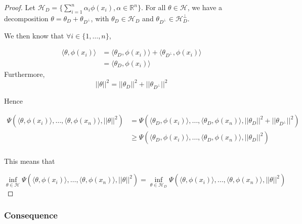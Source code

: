 \documentclass[
10pt, %
a4paper, %
oneside, %
headinclude,footinclude, %
BCOR5mm, %
]{scrartcl}
\begin{document}
\begin{proof}
    Let $ \mathcal{H}_D = \{  \sum^{n}_{i=1} \alpha_i\phi(x_i), \alpha\in \mathbb{R}^n\}$. For all $ \theta\in \mathcal{H} $, we have a decomposition $ \theta = \theta_D+ \theta_{D^{\perp}}$, with $ \theta_D \in \mathcal{H}_D $ and $ \theta_{D^{\perp}} \in \mathcal{H}_D^{\perp} $.

    We then know that $\forall i\in \{1, \dots, n\}$,
    
    \begin{equation*}
	\begin{aligned}
	    \langle \theta, \phi(x_i) \rangle &= \langle \theta_D, \phi(x_i) \rangle+ \langle \theta_{D^{\perp}}, \phi(x_i) \rangle\\
	    &= \langle \theta_D, \phi(x_i) \rangle
	\end{aligned}
    \end{equation*}
    Furthermore,
    \begin{equation*}
	|| \theta||^2 = || \theta_D||^2+ || \theta_{D^{\perp}}||^2
    \end{equation*}

    Hence

    \begin{equation*}
        \begin{aligned}
            \label{eq:}
	    \Psi(\langle\theta,\phi(x_i) \rangle, \dots, \langle\theta, \phi(x_n) \rangle, ||\theta||^2)&=\Psi(\langle\theta_D,\phi(x_i) \rangle, \dots, \langle\theta_D, \phi(x_n) \rangle, || \theta_D||^2+ || \theta_{D^{\perp}}||^2)\\
	    &\geq \Psi(\langle\theta_D,\phi(x_i) \rangle, \dots, \langle\theta_D, \phi(x_n) \rangle, || \theta_D||^2)\\
        \end{aligned}
    \end{equation*}

    This means that

    \begin{equation*}
	\inf_{ \theta\in \mathcal{H} }\Psi(\langle\theta,\phi(x_i) \rangle, \dots, \langle\theta, \phi(x_n) \rangle, ||\theta||^2)  = \inf_{ \theta\in \mathcal{H}_D }\Psi(\langle\theta,\phi(x_i) \rangle, \dots, \langle\theta, \phi(x_n) \rangle, ||\theta||^2)
    \end{equation*}
    
\end{proof}

\subsubsection{\large\color{Periwinkle}Consequence}
\end{document}
